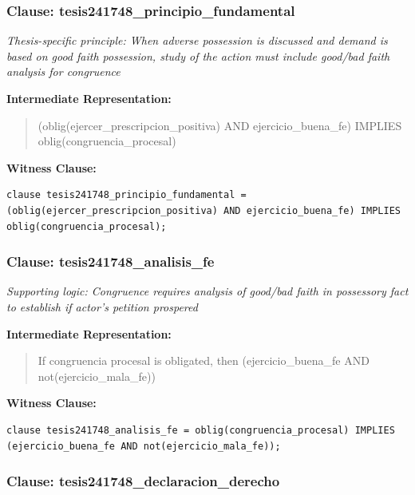 \documentclass[11pt,a4paper]{article}
\begin{document}
\subsubsection{Clause: tesis241748\_principio\_fundamental}

\textit{Thesis-specific principle: When adverse possession is discussed and demand is based on good faith possession, study of the action must include good/bad faith analysis for congruence}

\textbf{Intermediate Representation:}

\begin{quote}
(oblig(ejercer\_prescripcion\_positiva) AND ejercicio\_buena\_fe) IMPLIES oblig(congruencia\_procesal)
\end{quote}

\textbf{Witness Clause:}

\begin{lstlisting}[style=witnessstyle, language=Witness]
clause tesis241748_principio_fundamental = (oblig(ejercer_prescripcion_positiva) AND ejercicio_buena_fe) IMPLIES oblig(congruencia_procesal);
\end{lstlisting}

\subsubsection{Clause: tesis241748\_analisis\_fe}

\textit{Supporting logic: Congruence requires analysis of good/bad faith in possessory fact to establish if actor's petition prospered}

\textbf{Intermediate Representation:}

\begin{quote}
If congruencia procesal is obligated, then (ejercicio\_buena\_fe AND not(ejercicio\_mala\_fe))
\end{quote}

\textbf{Witness Clause:}

\begin{lstlisting}[style=witnessstyle, language=Witness]
clause tesis241748_analisis_fe = oblig(congruencia_procesal) IMPLIES (ejercicio_buena_fe AND not(ejercicio_mala_fe));
\end{lstlisting}

\subsubsection{Clause: tesis241748\_declaracion\_derecho}
\end{document}
